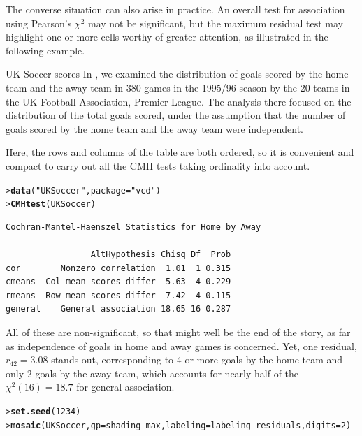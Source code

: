\documentclass[10pt,krantz2]{krantz}\usepackage[]{graphicx}\usepackage[]{color}
\makeatletter
\newcommand{\hlnum}[1]{\textcolor[rgb]{0.686,0.059,0.569}{#1}}%
\newcommand{\hlstr}[1]{\textcolor[rgb]{0.192,0.494,0.8}{#1}}%
\newcommand{\hlstd}[1]{\textcolor[rgb]{0.345,0.345,0.345}{#1}}%
\newcommand{\hlkwc}[1]{\textcolor[rgb]{0.333,0.667,0.333}{#1}}%
\newcommand{\hlkwd}[1]{\textcolor[rgb]{0.737,0.353,0.396}{\textbf{#1}}}%
\newenvironment{kframe}{%
 \def\at@end@of@kframe{}%
 \ifinner\ifhmode%
  \def\at@end@of@kframe{\end{minipage}}%
  \begin{minipage}{\columnwidth}%
 \fi\fi%
 \def\FrameCommand##1{\hskip\@totalleftmargin \hskip-\fboxsep
 \colorbox{shadecolor}{##1}\hskip-\fboxsep
     \hskip-\linewidth \hskip-\@totalleftmargin \hskip\columnwidth}%
 \MakeFramed {\advance\hsize-\width
   \@totalleftmargin\z@ \linewidth\hsize
   \@setminipage}}%
 {\par\unskip\endMakeFramed%
 \at@end@of@kframe}
\newenvironment{knitrout}{}{} %
\renewenvironment{knitrout}{\small\renewcommand{\baselinestretch}{.85}}{} %
\makeatother
\begin{document}
The converse situation can also arise in practice. An overall test for association
using Pearson's $\chi^2$ may not be significant, but the maximum residual test
may highlight one or more cells worthy of greater attention, as illustrated in
the following example.


\begin{Example}[soccer2]{UK Soccer scores}
In , we examined the distribution of goals scored
by the home team and the away team in 380 games in the 1995/96 season
by the 20 teams in the UK Football Association, Premier League.
The analysis there focused on the distribution of the total goals
scored, under the assumption that the number of goals scored by
the home team and the away team were independent.

Here, the rows and columns of the table  are both ordered,
so it is convenient and compact to carry out all the CMH tests taking
ordinality into account.
\begin{knitrout}
\color{fgcolor}\begin{kframe}
\begin{alltt}
\hlstd{> }\hlkwd{data}\hlstd{(}\hlstr{"UKSoccer"}\hlstd{,} \hlkwc{package} \hlstd{=} \hlstr{"vcd"}\hlstd{)}
\hlstd{> }\hlkwd{CMHtest}\hlstd{(UKSoccer)}
\end{alltt}
\begin{verbatim}
Cochran-Mantel-Haenszel Statistics for Home by Away 

                 AltHypothesis Chisq Df  Prob
cor        Nonzero correlation  1.01  1 0.315
cmeans  Col mean scores differ  5.63  4 0.229
rmeans  Row mean scores differ  7.42  4 0.115
general    General association 18.65 16 0.287
\end{verbatim}
\end{kframe}
\end{knitrout}
All of these are non-significant, so that might well be the end of the story,
as far as independence of goals in home and away games is concerned. Yet, one
residual, $r_{42} = 3.08$ stands out, corresponding to 4 or more goals by
the home team and only 2 goals by the away team, which accounts for nearly
half of the $\chi^2 (16) = 18.7$ for general association.

\begin{knitrout}
\color{fgcolor}\begin{kframe}
\begin{alltt}
\hlstd{> }\hlkwd{set.seed}\hlstd{(}\hlnum{1234}\hlstd{)}
\hlstd{> }\hlkwd{mosaic}\hlstd{(UKSoccer,} \hlkwc{gp} \hlstd{= shading_max,} \hlkwc{labeling} \hlstd{= labeling_residuals,} \hlkwc{digits} \hlstd{=} \hlnum{2}\hlstd{)}
\end{alltt}
\end{kframe}\begin{figure}[!htbp]


\end{figure}
\end{knitrout}
\end{Example}
\end{document}
